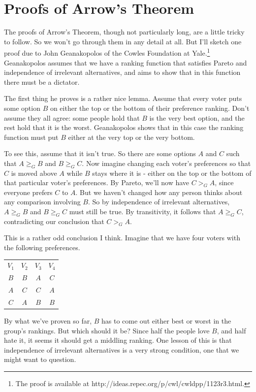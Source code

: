 \documentclass[openany]{book}
\begin{document}
\section{Proofs of Arrow's Theorem}
The proofs of Arrow's Theorem, though not particularly long, are a little tricky to follow. So we won't go through them in any detail at all. But I'll sketch one proof due to John Geanakopolos of the Cowles Foundation at Yale.\footnote{The proof is available at http://ideas.repec.org/p/cwl/cwldpp/1123r3.html.} Geanakopolos assumes that we have a ranking function that satisfies Pareto and independence of irrelevant alternatives, and aims to show that in this function there must be a dictator.

The first thing he proves is a rather nice lemma. Assume that every voter puts some option $B$ on either the top or the bottom of their preference ranking. Don't assume they all agree: some people hold that $B$ is the very best option, and the rest hold that it is the worst. Geanakopolos shows that in this case the ranking function must put $B$ either at the very top or the very bottom.

To see this, assume that it isn't true. So there are some options $A$ and $C$ such that $A \geq_G B$ and $B \geq_G C$. Now imagine changing each voter's preferences so that $C$ is moved above $A$ while $B$ stays where it is - either on the top or the bottom of that particular voter's preferences. By Pareto, we'll now have $C >_G A$, since everyone prefers $C$ to $A$. But we haven't changed how any person thinks about any comparison involving $B$. So by independence of irrelevant alternatives, $A \geq_G B$ and $B \geq_G C$ must still be true. By transitivity, it follows that $A \geq_G C$, contradicting our conclusion that $C >_G A$.

This is a rather odd conclusion I think. Imagine that we have four voters with the following preferences. 

\begin{center}
\begin{tabular}{c c c c}
$V_1$ & $V_2$ & $V_3$ & $V_4$ \\ 
$B$ & $B$ & $A$ & $C$ \\
$A$ & $C$ & $C$ & $A$ \\
$C$ & $A$ & $B$ & $B$
\end{tabular}
\end{center}
By what we've proven so far, $B$ has to come out either best or worst in the group's rankings. But which should it be? Since half the people love $B$, and half hate it, it seems it should get a middling ranking. One lesson of this is that independence of irrelevant alternatives is a very strong condition, one that we might want to question.
\end{document}
